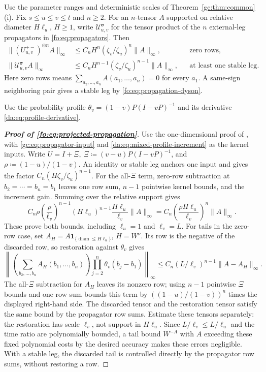 \documentclass[11pt]{article}
\numberwithin{equation}{section}
\theoremstyle{remark}
\newcommand{\diam}{\operatorname{diam}}
\begin{document}
Use the parameter ranges and deterministic scales of
Theorem~\ref{gc:thm:common}(i). Fix $s\le u\le v\le t$ and $n\ge2$.
For an $n$-tensor $A$ supported on relative diameter $H\ell_u$, $H\ge1$,
write $\mathcal U_{u,v}^{\boldsymbol\sigma}$ for the tensor product of
the $n$ external-leg propagators in \eqref{fo:eq:propagators}. Then
\begin{equation}\label{fo:eq:projected-propagation}
 \begin{aligned}
 \|(U_{u,v}^{+-})^{\otimes n}A\|_\infty
 &\le C_nH^n(\zeta_v/\zeta_u)^n\|A\|_\infty,
 &&\text{zero rows},\\
 \|\mathcal U_{u,v}^{\boldsymbol\sigma}A\|_\infty
 &\le C_nH^{n-1}(\zeta_v/\zeta_u)^{n-1}\|A\|_\infty,
 &&\text{at least one stable leg}.
 \end{aligned}
\end{equation}
Here zero rows means $\sum_{a_2,\ldots,a_n}A(a_1,\ldots,a_n)=0$
for every $a_1$. A same-sign neighboring pair gives a stable leg by
\eqref{fo:eq:propagation-dyson}.

Use the probability profile $\theta_v=(1-v)P(I-vP)^{-1}$ and its
derivative \eqref{da:eq:profile-derivative}.

\begin{proof}[\textbf{Proof of \eqref{fo:eq:projected-propagation}}]
Use the one-dimensional proof of
\cite[Lemma~7.7(I)--(II), Appendix~A.2]{TYY}, with
\eqref{gc:eq:propagator-input} and
\eqref{da:eq:mixed-profile-increment} as the kernel inputs.
Write $U=I+\Xi$, $\Xi\coloneqq(v-u)P(I-vP)^{-1}$, and
$\rho\coloneqq(1-u)/(1-v)$.
An identity or stable leg anchors one input and gives the factor
$C_n(H\zeta_v/\zeta_u)^{n-1}$.
For the all-$\Xi$ term, zero-row subtraction at $b_2=\cdots=b_n=b_1$
leaves one row sum, $n-1$ pointwise kernel bounds, and the increment
gain. Summing over the relative support gives
\[
 C_n\rho\left(\frac{\rho}{\ell_v}\right)^{n-1}
 (H\ell_u)^{n-1}\frac{H\ell_u}{\ell_v}\|A\|_\infty
 =C_n\left(\frac{\rho H\ell_u}{\ell_v}\right)^n\|A\|_\infty.
\]
These prove both bounds, including $\ell_u=1$ and $\ell_v=L$.
For tails in the zero-row case, set
$A_H=A\mathbf1_{\{\diam\le H\ell_u\}}$, $H=W^\nu$.
Its row is the negative of the discarded row, so restoration
against $\theta_v$ gives
\[
 \left\|\left(\sum_{b_2,\ldots,b_n}A_H(b_1,\ldots,b_n)\right)
       \prod_{j=2}^n\theta_v(b_j-b_1)\right\|_\infty
 \le C_n(L/\ell_v)^{n-1}\|A-A_H\|_\infty.
\]
The all-$\Xi$ subtraction for $A_H$ leaves its nonzero row; using
$n-1$ pointwise $\Xi$ bounds and one row sum bounds this term by
$((1-u)/(1-v))^n$ times the displayed right-hand side.
The discarded tensor and the restoration tensor satisfy the same
bound by the propagator row sums. Estimate these tensors separately:
the restoration has scale $\ell_v$, not support in $H\ell_u$.
Since $L/\ell_v\le L/\ell_u$ and the time ratio are polynomially
bounded, a tail bound $W^{-A}$ with $A$ exceeding these fixed polynomial
costs by the desired accuracy makes these errors negligible.
With a stable leg, the discarded tail is controlled directly by
the propagator row sums, without restoring a row.
\end{proof}
\end{document}

